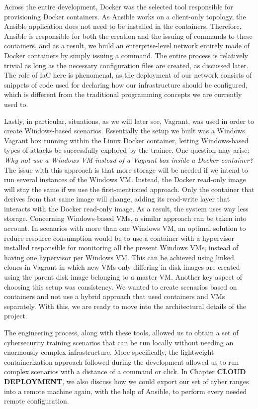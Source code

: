 Across the entire development, Docker was the selected tool responsible for provisioning Docker containers. As Ansible works on a client-only topology, the Ansible application does not need to be installed in the containers. Therefore, Ansible is responsible for both the creation and the issuing of commands to these containers, and as a result, we build an enterprise-level network entirely made of Docker containers by simply issuing a command. The entire process is relatively trivial as long as the necessary configuration files are created, as discussed later. The role of IaC here is phenomenal, as the deployment of our network consists of snippets of code used for declaring how our infrastructure should be configured, which is different from the traditional programming concepts we are currently used to.

Lastly, in particular, situations, as we will later see, Vagrant, was used in order to create Windows-based scenarios. Essentially the setup we built was a Windows Vagrant box running within the Linux Docker container, letting Windows-based types of attacks be successfully explored by the trainee. One question may arise: \textit{Why not use a Windows VM instead of a Vagrant box inside a Docker container?} The issue with this approach is that more storage will be needed if we intend to run several instances of the Windows VM. Instead, the Docker read-only image will stay the same if we use the first-mentioned approach.
Only the container that derives from that same image will change, adding its read-write layer that interacts with the Docker read-only image. As a result, the system uses way less storage. Concerning Windows-based VMs, a similar approach can be taken into account. In scenarios with more than one Windows VM, an optimal solution to reduce resource consumption would be to use a container with a hypervisor installed responsible for monitoring all the present Windows VMs, instead of having one hypervisor per Windows VM. This can be achieved using linked clones in Vagrant in which new VMs only differing in disk images are created using the parent disk image belonging to a master VM. Another key aspect of choosing this setup was consistency. We wanted to create scenarios based on containers and not use a hybrid approach that used containers and VMs separately. With this, we are ready to move into the architectural details of the project.

The engineering process, along with these tools, allowed us to obtain a set of cybersecurity training scenarios that can be run locally without needing an enormously complex infrastructure. More specifically, the lightweight containerization approach followed during the development allowed us to run complex scenarios with a distance of a command or click. In Chapter \textbf{CLOUD DEPLOYMENT}, we also discuss how we could export our set of cyber ranges into a remote machine again, with the help of Ansible, to perform every needed remote configuration.

